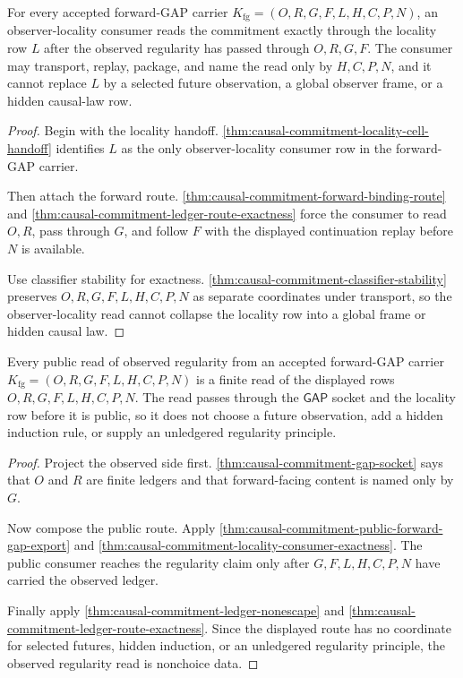 \begin{theorem}
\label{thm:causal-commitment-locality-consumer-exactness}
For every accepted forward-GAP carrier $K_{\mathrm{fg}}=(O,R,G,F,L,H,C,P,N)$, an observer-locality consumer reads the commitment exactly through the locality row $L$ after the observed regularity has passed through $O,R,G,F$. The consumer may transport, replay, package, and name the read only by $H,C,P,N$, and it cannot replace $L$ by a selected future observation, a global observer frame, or a hidden causal-law row.
\end{theorem}
\begin{proof}
Begin with the locality handoff. \autoref{thm:causal-commitment-locality-cell-handoff} identifies $L$ as the only observer-locality consumer row in the forward-GAP carrier.

Then attach the forward route. \autoref{thm:causal-commitment-forward-binding-route} and \autoref{thm:causal-commitment-ledger-route-exactness} force the consumer to read $O,R$, pass through $G$, and follow $F$ with the displayed continuation replay before $N$ is available.

Use classifier stability for exactness. \autoref{thm:causal-commitment-classifier-stability} preserves $O,R,G,F,L,H,C,P,N$ as separate coordinates under transport, so the observer-locality read cannot collapse the locality row into a global frame or hidden causal law.
\end{proof}

\begin{theorem}
\label{thm:causal-commitment-observed-regularity-nonchoice}
Every public read of observed regularity from an accepted forward-GAP carrier $K_{\mathrm{fg}}=(O,R,G,F,L,H,C,P,N)$ is a finite read of the displayed rows $O,R,G,F,L,H,C,P,N$. The read passes through the $\mathsf{GAP}$ socket and the locality row before it is public, so it does not choose a future observation, add a hidden induction rule, or supply an unledgered regularity principle.
\end{theorem}
\begin{proof}
Project the observed side first. \autoref{thm:causal-commitment-gap-socket} says that $O$ and $R$ are finite ledgers and that forward-facing content is named only by $G$.

Now compose the public route. Apply \autoref{thm:causal-commitment-public-forward-gap-export} and \autoref{thm:causal-commitment-locality-consumer-exactness}. The public consumer reaches the regularity claim only after $G,F,L,H,C,P,N$ have carried the observed ledger.

Finally apply \autoref{thm:causal-commitment-ledger-nonescape} and \autoref{thm:causal-commitment-ledger-route-exactness}. Since the displayed route has no coordinate for selected futures, hidden induction, or an unledgered regularity principle, the observed regularity read is nonchoice data.
\end{proof}


